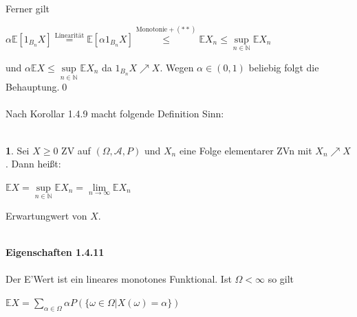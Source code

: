 \documentclass[10pt,a4paper]{report}
\numberwithin{equation}{section}
\numberwithin{figure}{section}
\theoremstyle{plain}
\theoremstyle{definition}
\newtheorem{defn}{\protect\definitionname}[section]
\theoremstyle{plain}
\theoremstyle{definition}
\theoremstyle{remark}
\theoremstyle{plain}
\theoremstyle{plain}
\theoremstyle{plain}
\theoremstyle{plain}
\theoremstyle{plain}
\providecommand{\definitionname}{Definition}
\newcommand{\1}{ \mathbb{1} } %
\begin{document}
Ferner gilt
\begin{center}
$\alpha \mathbb{E}[1_{B_n}X]\overset{\text{Linearität}}{=}\mathbb{E}[\alpha 1_{B_n}X]\overset{\text{Monotonie}+(**)}{\leq}\mathbb{E}X_n\leq\sup\limits_{n\in \mathbb{N}}\mathbb{E}X_n$
\end{center}
und $\alpha \mathbb{E}X\leq \sup\limits_{n\in \mathbb{N}}\mathbb{E}X_n$ da $1_{B_n}X\nearrow X$. Wegen $\alpha \in (0,1)$ beliebig folgt die Behauptung.\qed\\\\
Nach Korollar 1.4.9 macht folgende Definition Sinn:\\\\
\begin{defn}
  Sei $X\geq 0$ ZV auf $(\Omega,\mathcal{A},P)$ und $X_n$ eine Folge
  elementarer ZVn mit $X_n\nearrow X$. Dann heißt:
  \begin{center}
    $\mathbb{E}X=\sup\limits_{n\in
      \mathbb{N}}\mathbb{E}X_n=\lim\limits_{n \to
      \infty}\mathbb{E}X_n$
  \end{center}
  Erwartungwert von $X$.\\\\
\end{defn}
\textbf{Eigenschaften 1.4.11}\\\\
Der E'Wert ist ein lineares monotones Funktional. Ist $\Omega<\infty$ so gilt
\begin{center}
$\mathbb{E}X=\sum\limits_{\alpha \in \Omega}\alpha P(\{\omega \in \Omega|X(\omega)=\alpha\})$
\end{center}
\end{document}
